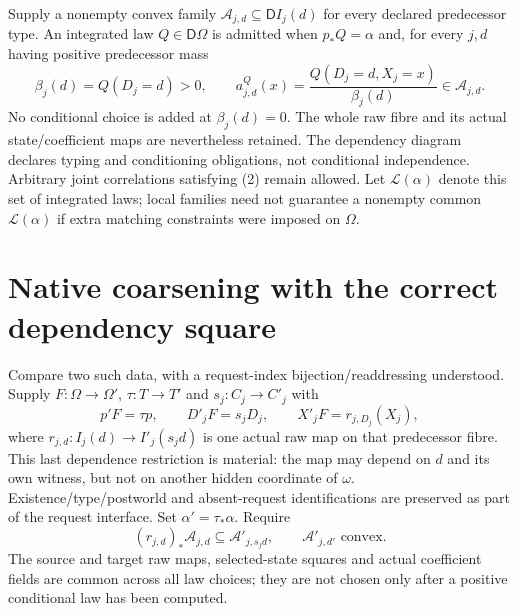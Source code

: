 \documentclass[11pt]{article}
\begin{document}
Supply a nonempty convex family $\mathcal A_{j,d}\subseteq\mathsf D I_j(d)$ for every declared predecessor type. An integrated law $Q\in\mathsf D\Omega$ is admitted when $p_*Q=\alpha$ and, for every $j,d$ having positive predecessor mass
\[
 \beta_j(d)=Q(D_j=d)>0,
 \qquad a^Q_{j,d}(x)=\frac{Q(D_j=d,X_j=x)}{\beta_j(d)}
                   \in\mathcal A_{j,d}.               \tag{2}
\]
No conditional choice is added at $\beta_j(d)=0$. The whole raw fibre and its actual state/coefficient maps are nevertheless retained. The dependency diagram declares typing and conditioning obligations, not conditional independence. Arbitrary joint correlations satisfying (2) remain allowed. Let $\mathcal L(\alpha)$ denote this set of integrated laws; local families need not guarantee a nonempty common $\mathcal L(\alpha)$ if extra matching constraints were imposed on $\Omega$.

\section{Native coarsening with the correct dependency square}
Compare two such data, with a request-index bijection/readdressing understood. Supply $F:\Omega\to\Omega'$, $\tau:T\to T'$ and $s_j:C_j\to C'_j$ with
\[
 p'F=\tau p,\qquad D'_jF=s_jD_j,
 \qquad X'_jF=r_{j,D_j}(X_j),                          \tag{3}
\]
where
$r_{j,d}:I_j(d)\to I'_j(s_jd)$ is one actual raw map on that predecessor fibre. This last dependence restriction is material: the map may depend on $d$ and its own witness, but not on another hidden coordinate of $\omega$. Existence/type/postworld and absent-request identifications are preserved as part of the request interface. Set $\alpha'=\tau_*\alpha$. Require
\[
 (r_{j,d})_*\mathcal A_{j,d}\subseteq\mathcal A'_{j,s_jd},
 \qquad \mathcal A'_{j,d'}\text{ convex}.              \tag{4}
\]
The source and target raw maps, selected-state squares and actual coefficient fields are common across all law choices; they are not chosen only after a positive conditional law has been computed.
\end{document}

